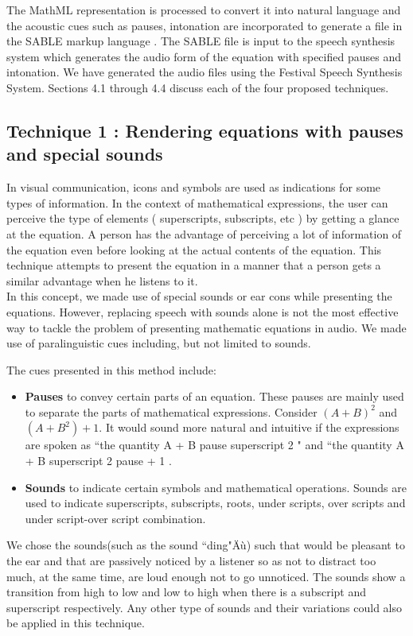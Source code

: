 \documentclass{article}
\begin{document}
The MathML representation is processed to convert it into natural language and the acoustic cues such as pauses, intonation are incorporated to generate a file in the SABLE markup language \cite{sproat1998sable}. 
The SABLE file is input to the speech synthesis system which generates the audio form of the equation with specified pauses and intonation. We have generated the audio files using the Festival Speech Synthesis System\cite{black2002festival}. 
Sections 4.1 through 4.4 discuss each of the four proposed techniques. 



\subsection{ Technique 1 : Rendering equations with pauses and special sounds}
\label{ssec:t2}

In visual communication, icons and symbols are used as indications for some types of information. In the context of mathematical expressions, the user can perceive the type of elements ( superscripts, subscripts, etc ) by getting a glance at the equation. A person has the advantage of perceiving a lot of information of the equation even before looking at the actual contents of the equation. This technique attempts to present the equation in a manner that a person gets a similar advantage when he listens to it.\\

 In this concept, we made use of special sounds or ear cons while presenting the equations. However, replacing speech with sounds alone is not the most effective way to tackle the problem of presenting mathematic equations in audio. We made use of paralinguistic cues including, but not limited to sounds.

The cues presented in this method include:
\begin{itemize}
\item \textbf{Pauses} to convey certain parts of an equation.
These pauses are mainly used to separate the parts of mathematical expressions. Consider $(A+B)^2$ and $(A+B^2)+1$.
It would sound more natural and intuitive if the expressions are spoken as ``the quantity A + B pause superscript 2 " and ``the quantity A + B superscript 2 pause + 1 .
\item \textbf{Sounds} to indicate certain symbols and mathematical operations.  Sounds are used to indicate superscripts, subscripts, roots, under scripts, over scripts and under script-over script combination.
\end{itemize}
We chose the sounds(such as the sound ``ding"Äù) such that would be pleasant to the ear and that are passively noticed by a listener so as not to distract too much, at the same time, are loud enough not to go unnoticed. The sounds show a transition from high to low and low to high when there is a subscript and superscript respectively. Any other type of sounds  and their variations could also be applied in this technique.
\end{document}
